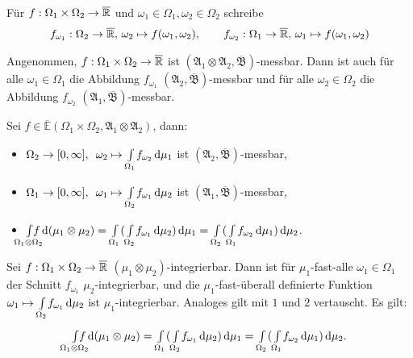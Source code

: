 \documentclass{cheat-sheet}
\newcommand{\ER}{\overline\R} %
\newcommand{\Alg}{\mathfrak{A}} %
\newcommand{\Bor}{\mathfrak{B}} %
\newcommand{\E}{\mathbb{E}} %
\begin{document}
\begin{nota}
  Für $f : \Omega_1 \times \Omega_2 \to \ER$ und $\omega_1 \in \Omega_1, \omega_2 \in \Omega_2$ schreibe
  \begin{align*}
    f_{\omega_1} : \Omega_2 \to \ER, \, \omega_2 \mapsto f(\omega_1, \omega_2), \qquad
    f_{\omega_2} : \Omega_1 \to \ER, \, \omega_1 \mapsto f(\omega_1, \omega_2)
  \end{align*}
\end{nota}

\begin{lem}
  Angenommen, $f : \Omega_1 \times \Omega_2 \to \ER$ ist $(\Alg_1 \otimes \Alg_2, \overline{\Bor})$-messbar. Dann ist auch für alle $\omega_1 \in \Omega_1$ die Abbildung $f_{\omega_1}$ $(\Alg_2, \overline{\Bor})$-messbar und für alle $\omega_2 \in \Omega_2$ die Abbildung $f_{\omega_2}$ $(\Alg_1, \overline{\Bor})$-messbar.
\end{lem}

\begin{satz}[Tonelli]
  Sei $f \in \overline{\E}(\Omega_1 \times \Omega_2, \Alg_1 \otimes \Alg_2)$, dann:
  \begin{itemize}
    \item $\Omega_2 \to [0, \infty], \enspace \omega_2 \mapsto {\textstyle \int\limits_{\Omega_1}^{}} f_{\omega_2} \,\mathrm{d} \mu_1$ \enspace ist $(\Alg_2, \overline{\Bor})$-messbar,
    \item $\Omega_1 \to [0, \infty], \enspace \omega_1 \mapsto {\textstyle \int\limits_{\Omega_2}^{}} f_{\omega_1} \,\mathrm{d} \mu_2$ \enspace ist $(\Alg_1, \overline{\Bor})$-messbar,
    \item \quad $\Int{\mathclap{\Omega_1 \otimes \Omega_2}}{}{f}{(\mu_1 \otimes \mu_2)} = \Int{\Omega_1}{}{(\Int{\Omega_2}{}{f_{\omega_1}}{\mu_2})}{\mu_1} = \Int{\Omega_2}{}{(\Int{\Omega_1}{}{f_{\omega_2}}{\mu_1})}{\mu_2}$.
  \end{itemize}
\end{satz}

\begin{satz}[Fubini]
  Sei $f : \Omega_1 \times \Omega_2 \to \ER$ $(\mu_1 \otimes \mu_2)$-integrierbar. Dann ist für $\mu_1$-fast-alle $\omega_1 \in \Omega_1$ der Schnitt $f_{\omega_1}$ $\mu_2$-integrierbar, und die $\mu_1$-fast-überall definierte Funktion $\omega_1 \mapsto {\textstyle \int\limits_{\Omega_2}^{}} f_{\omega_1} \,\mathrm{d} \mu_2$ ist $\mu_1$-integrierbar. Analoges gilt mit $1$ und $2$ vertauscht. Es gilt:
  \[ \Int{\mathclap{\Omega_1 \otimes \Omega_2}}{}{f}{(\mu_1 \otimes \mu_2)} = \Int{\Omega_1}{}{(\Int{\Omega_2}{}{f_{\omega_1}}{\mu_2})}{\mu_1} = \Int{\Omega_2}{}{(\Int{\Omega_1}{}{f_{\omega_2}}{\mu_1})}{\mu_2}. \]
\end{satz}
\end{document}
